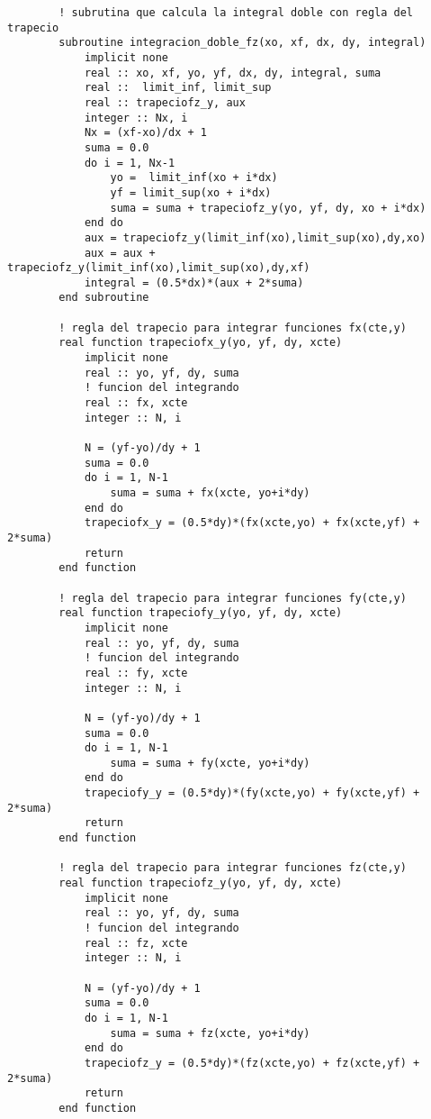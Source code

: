 \begin{lstlisting}
        ! subrutina que calcula la integral doble con regla del trapecio
        subroutine integracion_doble_fz(xo, xf, dx, dy, integral)
            implicit none
            real :: xo, xf, yo, yf, dx, dy, integral, suma
            real ::  limit_inf, limit_sup
            real :: trapeciofz_y, aux
            integer :: Nx, i
            Nx = (xf-xo)/dx + 1
            suma = 0.0
            do i = 1, Nx-1
                yo =  limit_inf(xo + i*dx)
                yf = limit_sup(xo + i*dx)
                suma = suma + trapeciofz_y(yo, yf, dy, xo + i*dx)
            end do
            aux = trapeciofz_y(limit_inf(xo),limit_sup(xo),dy,xo) 
            aux = aux + trapeciofz_y(limit_inf(xo),limit_sup(xo),dy,xf)
            integral = (0.5*dx)*(aux + 2*suma)
        end subroutine

        ! regla del trapecio para integrar funciones fx(cte,y)
        real function trapeciofx_y(yo, yf, dy, xcte)
            implicit none
            real :: yo, yf, dy, suma
            ! funcion del integrando
            real :: fx, xcte
            integer :: N, i

            N = (yf-yo)/dy + 1
            suma = 0.0
            do i = 1, N-1
                suma = suma + fx(xcte, yo+i*dy)
            end do
            trapeciofx_y = (0.5*dy)*(fx(xcte,yo) + fx(xcte,yf) + 2*suma)
            return
        end function

        ! regla del trapecio para integrar funciones fy(cte,y)
        real function trapeciofy_y(yo, yf, dy, xcte)
            implicit none
            real :: yo, yf, dy, suma
            ! funcion del integrando
            real :: fy, xcte
            integer :: N, i

            N = (yf-yo)/dy + 1
            suma = 0.0
            do i = 1, N-1
                suma = suma + fy(xcte, yo+i*dy)
            end do
            trapeciofy_y = (0.5*dy)*(fy(xcte,yo) + fy(xcte,yf) + 2*suma)
            return
        end function

        ! regla del trapecio para integrar funciones fz(cte,y)
        real function trapeciofz_y(yo, yf, dy, xcte)
            implicit none
            real :: yo, yf, dy, suma
            ! funcion del integrando
            real :: fz, xcte
            integer :: N, i

            N = (yf-yo)/dy + 1
            suma = 0.0
            do i = 1, N-1
                suma = suma + fz(xcte, yo+i*dy)
            end do
            trapeciofz_y = (0.5*dy)*(fz(xcte,yo) + fz(xcte,yf) + 2*suma)
            return
        end function
\end{lstlisting}